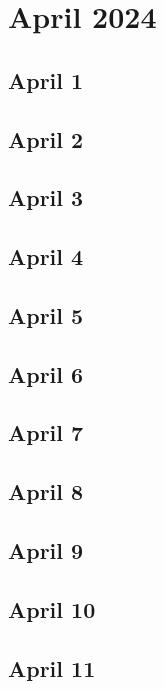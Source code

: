 %
%
%

\chapter{April 2024}
\label{intro} %

\section{April 1}

\section{April 2}

\section{April 3}

\section{April 4}

\section{April 5}

\section{April 6}

\section{April 7}

\section{April 8}

\section{April 9}

\section{April 10}

\section{April 11}

